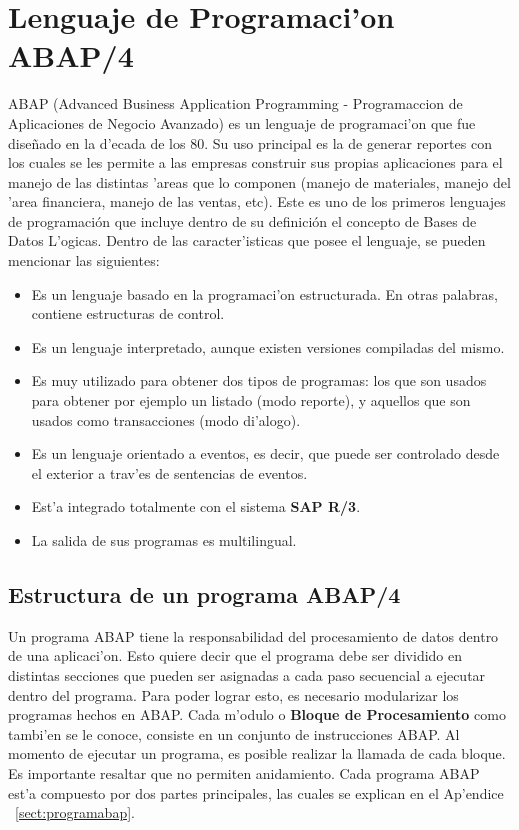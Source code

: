 \section{Lenguaje de Programaci'on ABAP/4} \label{sect:abap}
ABAP (Advanced Business Application Programming - Programaccion de Aplicaciones de Negocio Avanzado) es un lenguaje de programaci'on que fue dise\~nado en la d'ecada de los 80. Su uso principal es la de generar reportes con los cuales se les permite a las empresas construir sus propias aplicaciones para el manejo de las distintas 'areas que lo componen (manejo de materiales, manejo del 'area financiera, manejo de las ventas, etc).
\newline
\newline
Este es uno de los primeros lenguajes de programación que incluye dentro de su definición el concepto de Bases de Datos L'ogicas. 
\newline
\newline
Dentro de las caracter'isticas que posee el lenguaje, se pueden mencionar las siguientes:
\begin{itemize}
\item Es un lenguaje basado en la programaci'on estructurada. En otras palabras, contiene estructuras de control.
\item Es un lenguaje interpretado, aunque existen versiones compiladas del mismo.
\item Es muy utilizado para obtener dos tipos de programas: los que son usados para obtener por ejemplo un listado (modo reporte), y aquellos que son usados como transacciones (modo di'alogo).
\item Es un lenguaje orientado a eventos, es decir, que puede ser controlado desde el exterior a trav'es de sentencias de eventos.
\item Est'a integrado totalmente con el sistema \textbf{SAP R/3}.
\item La salida de sus programas es multilingual. 
\end{itemize}

\subsection{Estructura de un programa ABAP/4}
	Un programa ABAP tiene la responsabilidad del procesamiento de datos dentro de una aplicaci'on. Esto quiere decir que el programa debe ser dividido en distintas secciones que pueden ser asignadas a cada paso secuencial a ejecutar dentro del programa. Para poder lograr esto, es necesario modularizar los programas hechos en ABAP. Cada m'odulo o \textbf{Bloque de Procesamiento} como tambi'en se le conoce, consiste en un conjunto de instrucciones ABAP. Al momento de ejecutar un programa, es posible realizar la llamada de cada bloque. Es importante resaltar que no permiten anidamiento.
\newline
\newline
	Cada programa ABAP est'a compuesto por dos partes principales, las cuales se explican en el Ap'endice ~\ref{sect:programabap}.

